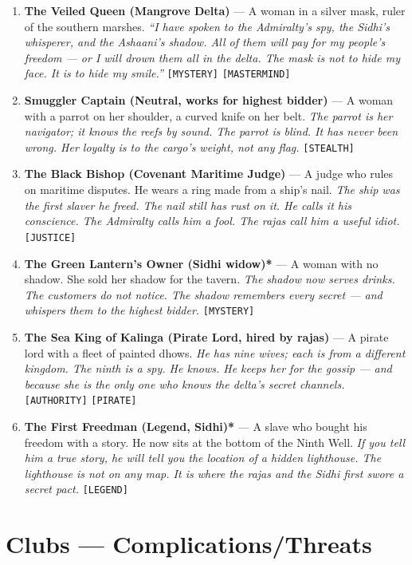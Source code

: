 \begin{enumerate}
\item \textbf{The Veiled Queen (Mangrove Delta)\textdagger} --- A woman in a silver mask, ruler of the southern marshes.
  \hfill \textit{``I have spoken to the Admiralty's spy, the Sidhi's whisperer, and the Ashaani's shadow. All of them will pay for my people's freedom --- or I will drown them all in the delta. The mask is not to hide my face. It is to hide my smile.''} \texttt{[MYSTERY]} \texttt{[MASTERMIND]}
\item \textbf{Smuggler Captain (Neutral, works for highest bidder)} --- A woman with a parrot on her shoulder, a curved knife on her belt.
  \hfill \textit{The parrot is her navigator; it knows the reefs by sound. The parrot is blind. It has never been wrong. Her loyalty is to the cargo's weight, not any flag.} \texttt{[STEALTH]}
\item[J] \textbf{The Black Bishop (Covenant Maritime Judge)} --- A judge who rules on maritime disputes. He wears a ring made from a ship's nail.
  \hfill \textit{The ship was the first slaver he freed. The nail still has rust on it. He calls it his conscience. The Admiralty calls him a fool. The rajas call him a useful idiot.} \texttt{[JUSTICE]}
\item[Q] \textbf{The Green Lantern's Owner (Sidhi widow)*} --- A woman with no shadow. She sold her shadow for the tavern.
  \hfill \textit{The shadow now serves drinks. The customers do not notice. The shadow remembers every secret --- and whispers them to the highest bidder.} \texttt{[MYSTERY]}
\item[K] \textbf{The Sea King of Kalinga (Pirate Lord, hired by rajas)\textdagger} --- A pirate lord with a fleet of painted dhows.
  \hfill \textit{He has nine wives; each is from a different kingdom. The ninth is a spy. He knows. He keeps her for the gossip --- and because she is the only one who knows the delta's secret channels.} \texttt{[AUTHORITY]} \texttt{[PIRATE]}
\item[A] \textbf{The First Freedman (Legend, Sidhi)*} --- A slave who bought his freedom with a story. He now sits at the bottom of the Ninth Well.
  \hfill \textit{If you tell him a true story, he will tell you the location of a hidden lighthouse. The lighthouse is not on any map. It is where the rajas and the Sidhi first swore a secret pact.} \texttt{[LEGEND]}
\end{enumerate}

\section*{Clubs --- Complications/Threats}
\label{sec:brasscoast-complications}

